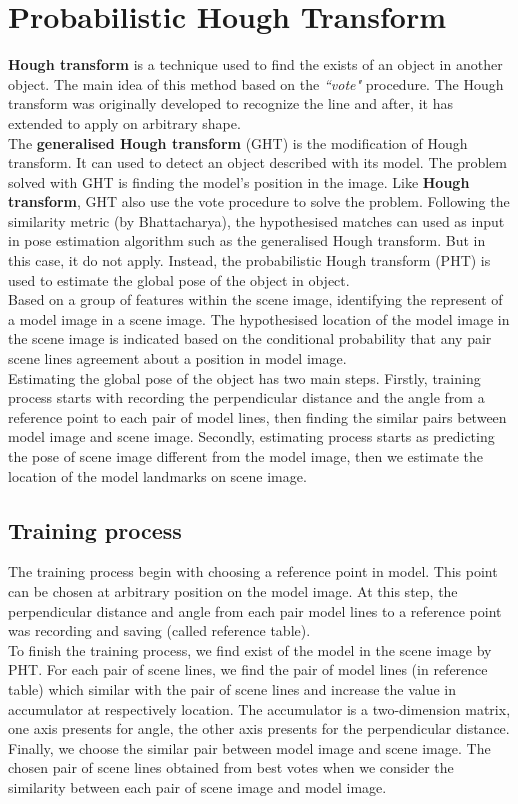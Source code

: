 \section{Probabilistic Hough Transform}
\textbf{Hough transform} is a technique used to find the exists of an object in another object. The main idea of this method based on the \textit{``vote"} procedure. The Hough transform was originally developed to recognize the line\cite{hough1962method} and after, it has extended to apply on arbitrary shape\cite{duda1972use}.\\[0.2cm]
The \textbf{generalised Hough transform}\cite{ballard1981generalizing} (GHT) is the modification of Hough transform. It can used to detect an object described with its model. The problem solved with GHT is finding the model's position in the image. Like \textbf{Hough transform}, GHT also use the vote procedure to solve the problem. Following the similarity metric (by Bhattacharya), the hypothesised matches can used as input in pose estimation algorithm such as the generalised Hough transform. But in this case, it do not apply. Instead, the probabilistic Hough transform (PHT) is used to estimate the global pose of the object\cite{ashbrook1995robust} in object.\\[0.3cm]
Based on a group of features within the scene image, identifying the represent of a model image in a scene image. The hypothesised location of the model image in the scene image is indicated based on the conditional probability that any pair scene lines agreement about a position in model image.\\[0.3cm]
Estimating the global pose of the object has two main steps. Firstly, training process starts with recording the perpendicular distance and the angle from a reference point to each pair of model lines, then finding the similar pairs between model image and scene image. Secondly, estimating process starts as predicting the pose of scene image different from the model image, then we estimate the location of the model landmarks on scene image.
\subsection{Training process}
The training process begin with choosing a reference point in model. This point can be chosen at arbitrary position on the model image. At this step, the perpendicular distance and angle from each pair model lines to a reference point was recording and saving (called reference table). \\
To finish the training process, we find exist of the model in the scene image by PHT. For each pair of scene lines, we find the pair of model lines (in reference table) which similar with the pair of scene lines and increase the value in accumulator at respectively location. The accumulator is a two-dimension matrix, one axis presents for angle, the other axis presents for the perpendicular distance. Finally, we choose the similar pair between model image and scene image. The chosen pair of scene lines obtained from best votes when we consider the similarity between each pair of scene image and model image.
